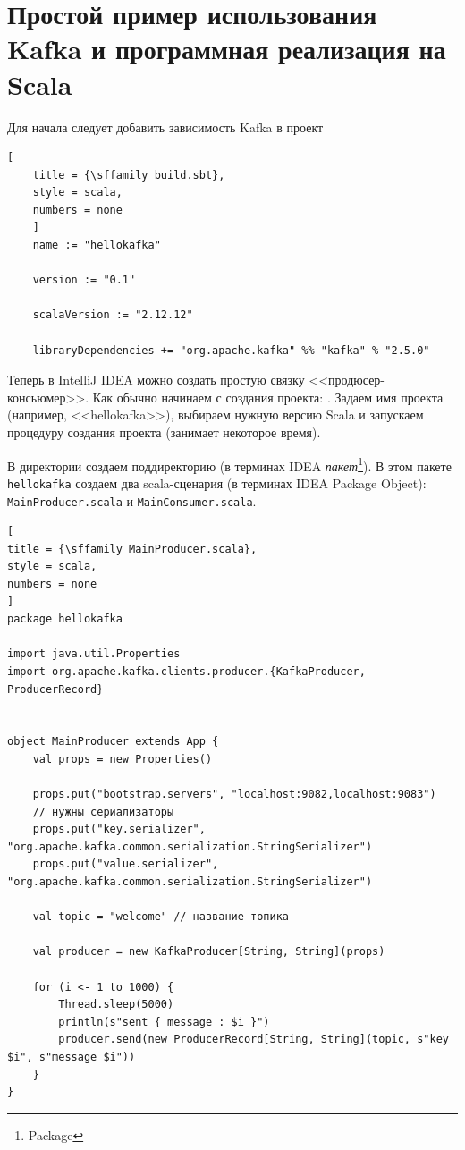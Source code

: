 \documentclass[%
	11pt,
	a4paper,
	utf8,
		]{article}
\begin{document}
\section{Простой пример использования Kafka и программная реализация на Scala}

Для начала следует добавить зависимость Kafka в проект
\begin{lstlisting}[
	title = {\sffamily build.sbt},
	style = scala,
	numbers = none	
	]
	name := "hellokafka"
	
	version := "0.1"
	
	scalaVersion := "2.12.12"
	
	libraryDependencies += "org.apache.kafka" %% "kafka" % "2.5.0"
\end{lstlisting}

Теперь в IntelliJ IDEA можно создать простую связку <<продюсер-консьюмер>>. Как обычно начинаем с создания проекта: . Задаем имя проекта (например, <<hellokafka>>), выбираем нужную версию Scala и запускаем процедуру создания проекта (занимает некоторое время).

В директории  создаем поддиректорию  (в терминах IDEA \emph{пакет}\footnote{Package}). В этом пакете \texttt{hellokafka} создаем два scala-сценария (в терминах IDEA Package Object): \texttt{MainProducer.scala} и \texttt{MainConsumer.scala}.

\begin{lstlisting}[
title = {\sffamily MainProducer.scala},
style = scala,
numbers = none
]
package hellokafka

import java.util.Properties
import org.apache.kafka.clients.producer.{KafkaProducer, ProducerRecord}


object MainProducer extends App {
	val props = new Properties()
	
	props.put("bootstrap.servers", "localhost:9082,localhost:9083")
	// нужны сериализаторы
	props.put("key.serializer", "org.apache.kafka.common.serialization.StringSerializer")
	props.put("value.serializer", "org.apache.kafka.common.serialization.StringSerializer")
	
	val topic = "welcome" // название топика
	
	val producer = new KafkaProducer[String, String](props)
	
	for (i <- 1 to 1000) {
		Thread.sleep(5000)
		println(s"sent { message : $i }")
		producer.send(new ProducerRecord[String, String](topic, s"key $i", s"message $i"))
	}
}
\end{lstlisting}
\end{document}
